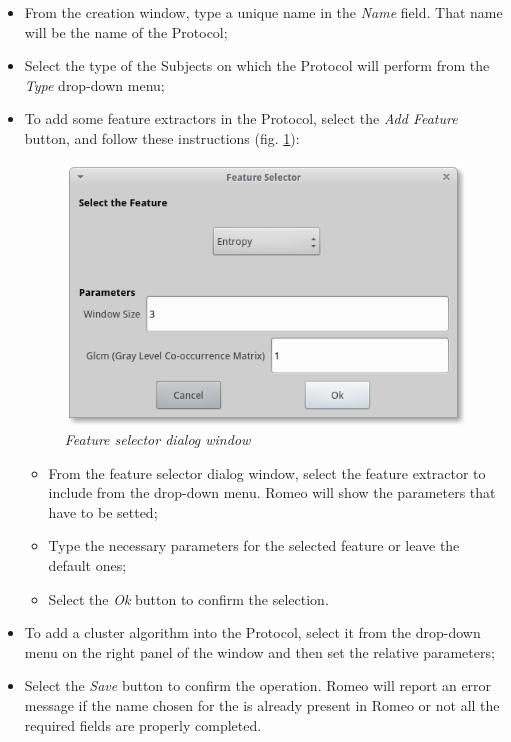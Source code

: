 \begin{itemize}
\item From the \protocol{} creation window, type a unique name in the \textit{Name} field. That name will be the name of the Protocol\g{};
\item Select the type of the Subjects\g{} on which the Protocol\g{} will perform from the \textit{Type} drop-down menu;
\item To add some feature extractors\g{} in the Protocol\g{}, select the \textit{Add Feature} button, and follow these instructions (fig. \ref{featureselector}):
\begin{figure}[!h]
\begin{center}
\includegraphics[scale=0.4]{./Images/FeatureSelector}
\caption{\textit{Feature selector dialog window}}
\label{featureselector}
\end{center}
\end{figure}
\begin{itemize}
\item From the feature selector dialog window, select the feature extractor to include from the drop-down menu. Romeo will show the parameters that have to be setted;
\item Type the necessary parameters for the selected feature or leave the default ones;
\item Select the \textit{Ok} button to confirm the selection.
\end{itemize}
\item To add a cluster algorithm into the Protocol\g{}, select it from the drop-down menu on the right panel of the window and then set the relative parameters;
\item Select the \textit{Save} button to confirm the operation. Romeo will report an error message if the name chosen for the \protocol{} is already present in Romeo or not all the required fields are properly completed.
\end{itemize}

